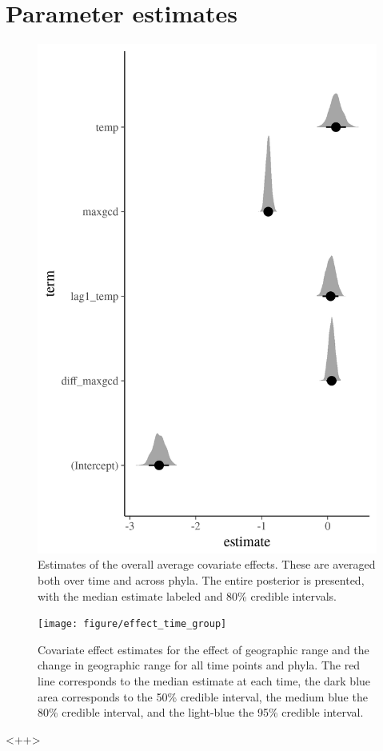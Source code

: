 \documentclass[12pt,letterpaper]{article}
\begin{document}
\section{Parameter estimates}

\begin{figure}[ht]
  \centering
  \includegraphics[width=\textwidth,height=0.5\textheight,keepaspectratio=true]{figure/effect_est}
  \caption{Estimates of the overall average covariate effects. These are averaged both over time and across phyla. The entire posterior is presented, with the median estimate labeled and 80\% credible intervals.}
  \label{fig:effect_est}
\end{figure}

\begin{figure}[ht]
  \centering
  \texttt{[image: figure/effect\_time\_group]}
  \caption{Covariate effect estimates for the effect of geographic range and the change in geographic range for all time points and phyla. The red line corresponds to the median estimate at each time, the dark blue area corresponds to the 50\% credible interval, the medium blue the 80\% credible interval, and the light-blue the 95\% credible interval.}
  \label{fig:<+label+>}
\end{figure}<++>


\end{document}
